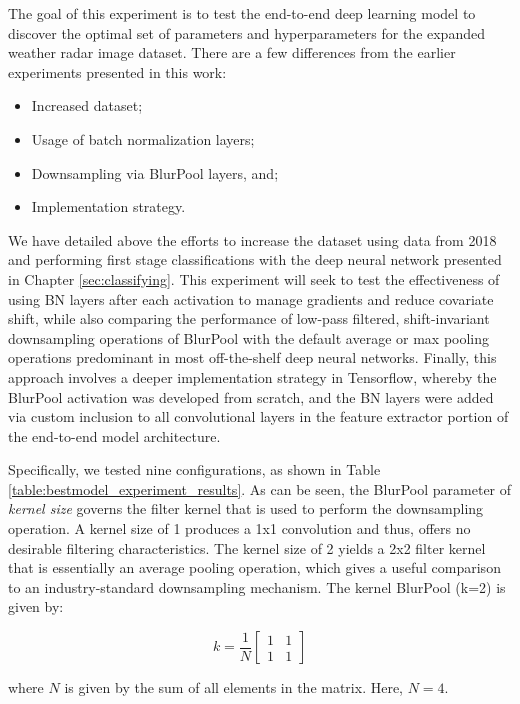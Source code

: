 The goal of this experiment is to test the end-to-end deep learning model to discover the optimal set of parameters and hyperparameters for the expanded weather radar image dataset.
There are a few differences from the earlier experiments presented in this work:

\begin{itemize}
	\item Increased dataset;
	\item Usage of batch normalization layers;
	\item Downsampling via BlurPool layers, and;
	\item Implementation strategy.
\end{itemize}

We have detailed above the efforts to increase the dataset using data from 2018 and performing first stage classifications with the deep neural network presented in Chapter \ref{sec:classifying}.
This experiment will seek to test the effectiveness of using BN layers after each activation to manage gradients and reduce covariate shift, while also comparing the performance of low-pass filtered, shift-invariant downsampling operations of BlurPool with the default average or max pooling operations predominant in most off-the-shelf deep neural networks.
Finally, this approach involves a deeper implementation strategy in Tensorflow, whereby the BlurPool activation was developed from scratch, and the BN layers were added via custom inclusion to all convolutional layers in the feature extractor portion of the end-to-end model architecture.

Specifically, we tested nine configurations, as shown in Table \ref{table:bestmodel_experiment_results}.
As can be seen, the BlurPool parameter of \textit{kernel size} governs the filter kernel that is used to perform the downsampling operation.
A kernel size of 1 produces a 1x1 convolution and thus, offers no desirable filtering characteristics.
The kernel size of 2 yields a 2x2 filter kernel that is essentially an average pooling operation, which gives a useful comparison to an industry-standard downsampling mechanism.
The kernel BlurPool (k=2) is given by:

\[
k=\frac{1}{N}
	\begin{bmatrix}
	1 & 1 \\
	1 & 1
	\end{bmatrix}
\]

where $N$ is given by the sum of all elements in the matrix. Here, $N=4$.

